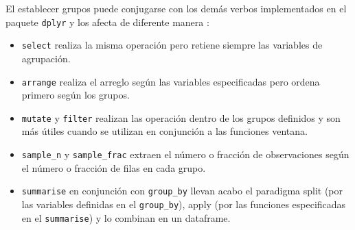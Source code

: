 \documentclass[]{article}
\newenvironment{Shaded}{\begin{snugshade}}{\end{snugshade}}
\newcommand{\KeywordTok}[1]{\textcolor[rgb]{0.13,0.29,0.53}{\textbf{#1}}}
\newcommand{\DataTypeTok}[1]{\textcolor[rgb]{0.13,0.29,0.53}{#1}}
\newcommand{\DecValTok}[1]{\textcolor[rgb]{0.00,0.00,0.81}{#1}}
\newcommand{\StringTok}[1]{\textcolor[rgb]{0.31,0.60,0.02}{#1}}
\newcommand{\CommentTok}[1]{\textcolor[rgb]{0.56,0.35,0.01}{\textit{#1}}}
\newcommand{\OperatorTok}[1]{\textcolor[rgb]{0.81,0.36,0.00}{\textbf{#1}}}
\newcommand{\NormalTok}[1]{#1}
\begin{document}
\begin{Shaded}
\end{Shaded}

\begin{curiosidad}
El establecer grupos puede conjugarse con los demás verbos implementados en 
el paquete \texttt{dplyr} y los afecta de diferente manera \parencite[][viñeta de introducción]{dplyr}:\\

\begin{itemize}
\item \texttt{select} realiza la misma operación pero retiene siempre las variables de agrupación.
\item \texttt{arrange} realiza el arreglo según las variables especificadas pero ordena primero según los grupos.
\item \texttt{mutate} y \texttt{filter} realizan las operación dentro de los grupos definidos y son más útiles cuando se utilizan en conjunción a las funciones ventana.
\item \texttt{sample\_n} y \texttt{sample\_frac} extraen el número o fracción de observaciones según el número o fracción de filas en cada grupo.
\item \texttt{summarise} en conjunción con \texttt{group\_by} llevan acabo el paradigma split (por las variables definidas en el \texttt{group\_by}), apply (por las funciones especificadas en el \texttt{summarise}) y lo combinan en un dataframe.
\end{itemize}
\end{curiosidad}
\end{document}
